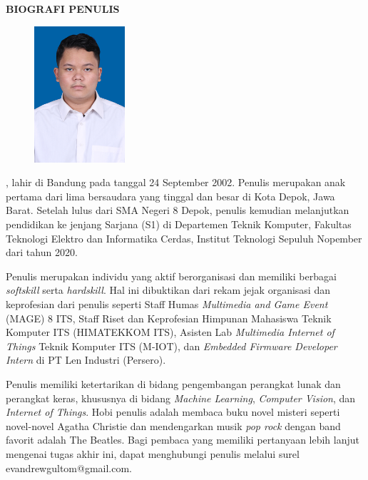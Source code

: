 \begin{center}
  \Large
  \textbf{BIOGRAFI PENULIS}
\end{center}


\vspace{2ex}

\begin{figure}
  \centering
  \vspace{-3ex}
  \includegraphics[width=0.3\textwidth]{gambar/evan.jpg}
  \vspace{-4ex}
\end{figure}

\name{}, lahir di Bandung pada tanggal 24 September 2002. Penulis merupakan anak pertama dari lima bersaudara yang tinggal dan besar di Kota Depok, Jawa Barat. Setelah lulus dari SMA Negeri 8 Depok, penulis kemudian melanjutkan pendidikan ke jenjang Sarjana (S1) di Departemen Teknik Komputer, Fakultas Teknologi Elektro dan Informatika Cerdas, Institut Teknologi Sepuluh Nopember dari tahun 2020. 

Penulis merupakan individu yang aktif berorganisasi dan memiliki berbagai \emph{softskill} serta \emph{hardskill}. Hal ini dibuktikan dari rekam jejak organisasi dan keprofesian dari penulis seperti Staff Humas \emph{Multimedia and Game Event} (MAGE) 8 ITS, Staff Riset dan Keprofesian Himpunan Mahasiswa Teknik Komputer ITS (HIMATEKKOM ITS), Asisten Lab \emph{Multimedia Internet of Things} Teknik Komputer ITS (M-IOT), dan \emph{Embedded Firmware Developer Intern} di PT Len Industri (Persero).

Penulis memiliki ketertarikan di bidang pengembangan perangkat lunak dan perangkat keras, khususnya di bidang \emph{Machine Learning}, \emph{Computer Vision}, dan \emph{Internet of Things}. Hobi penulis adalah membaca buku novel misteri seperti novel-novel Agatha Christie dan mendengarkan musik \emph{pop rock} dengan band favorit adalah The Beatles. Bagi pembaca yang memiliki pertanyaan lebih lanjut mengenai tugas akhir ini, dapat menghubungi penulis melalui surel evandrewgultom@gmail.com.